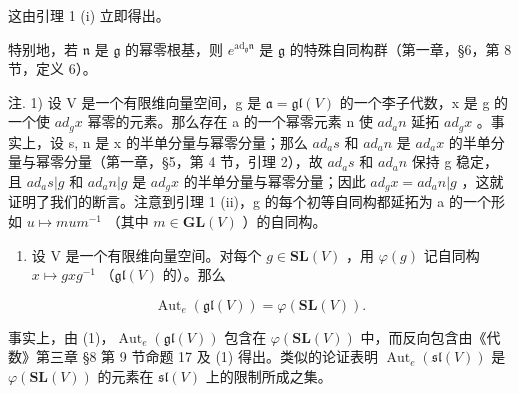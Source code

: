 这由引理 1 (i) 立即得出。

特别地，若 \(\mathfrak{n}\) 是 \(\mathfrak{g}\) 的幂零根基，则 \(e^{\mathrm{ad}_{\mathfrak{g}}\mathfrak{n}}\) 是 \(\mathfrak{g}\) 的特殊自同构群（第一章，§6，第 8 节，定义 6）。

注. 1) 设 V 是一个有限维向量空间，g 是 \(\mathfrak{a} = \mathfrak{gl}(V)\) 的一个李子代数，x 是 g 的一个使 \(ad_{g}x\) 幂零的元素。那么存在 a 的一个幂零元素 n 使 \(ad_{a}n\) 延拓 \(ad_{g}x\) 。事实上，设 s, n 是 x 的半单分量与幂零分量；那么 \(ad_{a}s\) 和 \(ad_{a}n\) 是 \(ad_{a}x\) 的半单分量与幂零分量（第一章，§5，第 4 节，引理 2），故 \(ad_{a}s\) 和 \(ad_{a}n\) 保持 g 稳定，且 \(ad_{a}s|g\) 和 \(ad_{a}n|g\) 是 \(ad_{g}x\) 的半单分量与幂零分量；因此 \(ad_{g}x = ad_{a}n|g\) ，这就证明了我们的断言。注意到引理 1 (ii)，g 的每个初等自同构都延拓为 a 的一个形如 \(u \mapsto mum^{-1}\) （其中 \(m \in \mathbf{GL}(V)\) ）的自同构。

\begin{enumerate}
\def\labelenumi{\arabic{enumi})}
\setcounter{enumi}{1}
\tightlist
\item
  设 V 是一个有限维向量空间。对每个 \(g \in \mathbf{SL}(V)\) ，用 \(\varphi(g)\) 记自同构 \(x \mapsto gxg^{-1}\) （\(\mathfrak{gl}(V)\) 的）。那么
\end{enumerate}

\[
\operatorname{Aut} _ {e} (\mathfrak {g l} (V)) = \varphi (\mathbf {S L} (V)).
\]

事实上，由 (1)，\(\operatorname{Aut}_{e}(\mathfrak{gl}(V))\) 包含在 \(\varphi(\mathbf{SL}(V))\) 中，而反向包含由《代数》第三章 §8 第 9 节命题 17 及 (1) 得出。类似的论证表明 \(\operatorname{Aut}_{e}(\mathfrak{sl}(V))\) 是 \(\varphi(\mathbf{SL}(V))\) 的元素在 \(\mathfrak{sl}(V)\) 上的限制所成之集。

